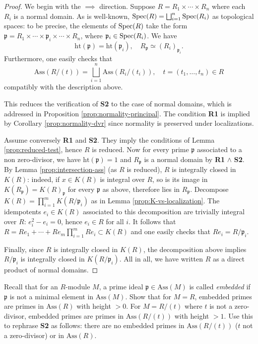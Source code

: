\begin{proof}
	We begin with the $\implies$ direction. Suppose $R = R_1 \times \cdots \times R_n$ where each $R_i$ is a normal domain. As is well-known, $\operatorname{Spec}(R) = \bigsqcup_{i=1}^n \operatorname{Spec}(R_i)$ as topological spaces: to be precise, the elements of $\operatorname{Spec}(R)$ take the form $\mathfrak{p} = R_1 \times \cdots \times \mathfrak{p}_i \times \cdots \times R_n$, where $\mathfrak{p}_i \in \operatorname{Spec}(R_i)$. We have
	\[ \text{ht}(\mathfrak{p}) = \text{ht}(\mathfrak{p}_i), \quad R_{\mathfrak{p}} \simeq (R_i)_{\mathfrak{p}_i}. \]
	Furthermore, one easily checks that
	\[ \text{Ass}(R/(t)) = \bigsqcup_{i=1}^n \text{Ass}(R_i/(t_i)), \quad t = (t_1, \ldots, t_n) \in R \]
	compatibly with the description above.
	
	This reduces the verification of \textbf{S2} to the case of normal domains, which is addressed in Proposition \ref{prop:normality-principal}. The condition \textbf{R1} is implied by Corollary \ref{prop:normality-dvr} since normality is preserved under localizations.
	
	Assume conversely \textbf{R1} and \textbf{S2}. They imply the conditions of Lemma \ref{prop:reduced-test}, hence $R$ is reduced. Now for every prime $\mathfrak{p}$ associated to a non zero-divisor, we have $\text{ht}(\mathfrak{p})=1$ and $R_{\mathfrak{p}}$ is a normal domain by \textbf{R1} $\wedge$ \textbf{S2}. By Lemma \ref{prop:intersection-ass} (as $R$ is reduced), $R$ is integrally closed in $K(R)$: indeed, if $x \in K(R)$ is integral over $R$, so is its image in $K(R_{\mathfrak{p}}) = K(R)_{\mathfrak{p}}$ for every $\mathfrak{p}$ as above, therefore lies in $R_{\mathfrak{p}}$. Decompose $K(R) = \prod_{i=1}^m K(R/\mathfrak{p}_i)$ as in Lemma \ref{prop:K-vs-localization}. The idempotents $e_i \in K(R)$ associated to this decomposition are trivially integral over $R$: $e_i^2 - e_i = 0$, hence $e_i \in R$ for all $i$. It follows that $R = Re_1 + \cdots + Re_m \prod_{i=1}^m Re_i \subset K(R)$ and one easily checks that $Re_i = R/\mathfrak{p}_i$.
	
	Finally, since $R$ is integrally closed in $K(R)$, the decomposition above implies $R/\mathfrak{p}_i$ is integrally closed in $K(R/\mathfrak{p}_i)$. All in all, we have written $R$ as a direct product of normal domains.
\end{proof}

\begin{exercise}
	Recall that for an $R$-module $M$, a prime ideal $\mathfrak{p} \in \text{Ass}(M)$ is called \emph{embedded} if $\mathfrak{p}$ is not a minimal element in $\text{Ass}(M)$. Show that for $M=R$, embedded primes are primes in $\text{Ass}(R)$ with height $> 0$. For $M=R/(t)$ where $t$ is not a zero-divisor, embedded primes are primes in $\text{Ass}(R/(t))$ with height $> 1$. Use this to rephrase \textbf{S2} as follows: there are no embedded primes in $\text{Ass}(R/(t))$ ($t$ not a zero-divisor) or in $\text{Ass}(R)$.
\end{exercise}

